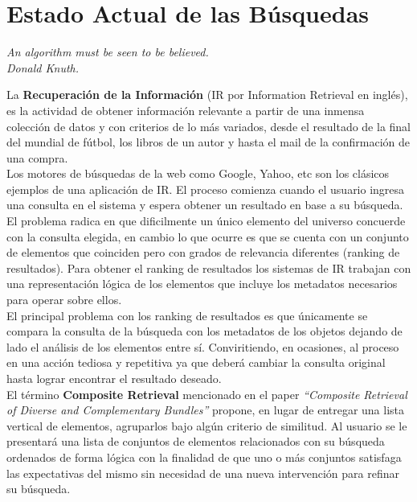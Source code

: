 \section{Estado Actual de las Búsquedas}
{\begin{small}%
\begin{flushright}%
\it An algorithm must be seen to be believed.\\Donald Knuth.
\end{flushright}%
\end{small}%
\vspace{.5cm}}
La \textbf{Recuperación de la Información} (IR por Information Retrieval en inglés), es la actividad de obtener información relevante a partir de una inmensa colección de datos y con criterios de lo más variados, desde el resultado de la final del mundial de fútbol, los libros de un autor y hasta el mail de la confirmación de una compra.\\
Los motores de búsquedas de la web como Google, Yahoo, etc son los clásicos ejemplos de una aplicación de IR. El proceso comienza cuando el usuario ingresa una consulta en el sistema y espera obtener un resultado en base a su búsqueda. El problema radica en que dificilmente un único elemento del universo concuerde con la consulta elegida, en cambio lo que ocurre es que se cuenta con un conjunto de elementos que coinciden pero con grados de relevancia diferentes (ranking de resultados). Para obtener el ranking de resultados los sistemas de IR trabajan con una representación lógica de los elementos que incluye los metadatos necesarios para operar sobre ellos.\\
El principal problema con los ranking de resultados es que únicamente se compara la consulta de la búsqueda con los metadatos de los objetos dejando de lado el análisis de los elementos entre sí. Conviritiendo, en ocasiones, al proceso en una acción tediosa y repetitiva ya que deberá cambiar la consulta original hasta lograr encontrar el resultado deseado.\\
El término \textbf{Composite Retrieval} mencionado en el paper \textit{\textquotedblleft Composite Retrieval of Diverse and Complementary Bundles\textquotedblright}\cite{compositeRetrival} propone, en lugar de entregar una lista vertical de elementos, agruparlos bajo algún criterio de similitud. Al usuario se le presentará una lista de conjuntos de elementos relacionados con su búsqueda
ordenados de forma lógica con la finalidad de que uno o más conjuntos satisfaga las expectativas del mismo sin necesidad de una nueva intervención para refinar su búsqueda.

